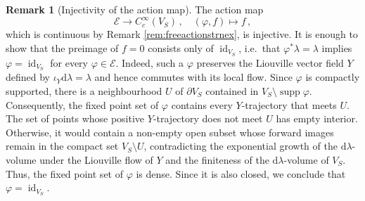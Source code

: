 \documentclass{amsart}
\theoremstyle{definition}
\newtheorem{rem}[prop]{Remark}
\newcommand{\rmd}{\mathrm d}
\newcommand{\EE}{\mathcal E}
\newcommand{\lra}{\longrightarrow}
\DeclareMathOperator{\id}{\mathrm{id}}
\DeclareMathOperator{\supp}{\mathrm{supp}}
\begin{document}
\begin{rem}[Injectivity of the action map]
\label{rem:injectivityactionmap}
The action map
\[
\EE\lra C_c^{\infty}(V_S)
\,,
\quad
(\varphi,f)\longmapsto f
\,,
\]
which is continuous by Remark \ref{rem:freeactionstrnex},
is injective.
It is enough to show
that the preimage of $f=0$ consists only of $\id_{V_S}$,
i.e.\ that $\varphi^*\lambda=\lambda$
implies $\varphi=\id_{V_S}$
for every $\varphi\in\EE$.
Indeed,
such a $\varphi$ preserves the Liouville vector field $Y$
defined by $\iota_Y\rmd\lambda=\lambda$
and hence commutes with its local flow.
Since $\varphi$ is compactly supported,
there is a neighbourhood $U$ of $\partial V_S$
contained in $V_S\setminus\supp\varphi$.
Consequently,
the fixed point set of $\varphi$
contains every $Y$-trajectory that meets $U$.
The set of points
whose positive $Y$-trajectory
does not meet $U$ has empty interior.
Otherwise,
it would contain a non-empty open subset
whose forward images remain
in the compact set $V_S\setminus U$,
contradicting the exponential growth
of the $\rmd\lambda$-volume under the Liouville flow of $Y$
and the finiteness of the $\rmd\lambda$-volume of $V_S$.
Thus, the fixed point set of $\varphi$ is dense.
Since it is also closed, we conclude that $\varphi=\id_{V_S}$.
\end{rem}
\end{document}
